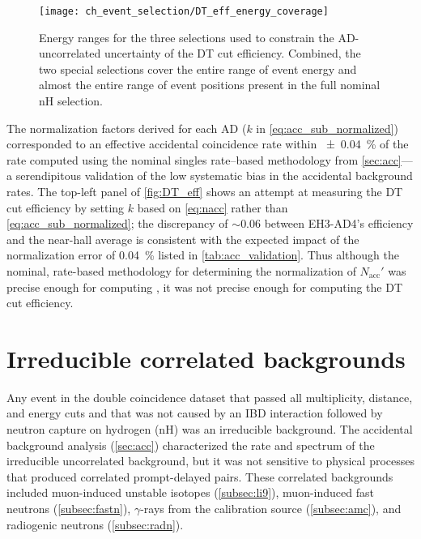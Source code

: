 \begin{figure}
    \centering
    \texttt{[image: ch\_event\_selection/DT\_eff\_energy\_coverage]}
    \caption[DT efficiency study energy coverage]{
        Energy ranges for the three selections used to constrain
        the AD-uncorrelated uncertainty of the DT cut efficiency.
        Combined, the two special selections cover the entire range of event energy
        and almost the entire range of event positions
        present in the full nominal nH selection.
    }
    \label{fig:DT_energy_range}
\end{figure}

The normalization factors derived for each AD ($k$ in \cref{eq:acc_sub_normalized})
corresponded to an effective accidental coincidence rate
within \SI{\pm0.04}{\percent} of the rate computed
using the nominal singles rate--based methodology from \cref{sec:acc}---%
a serendipitous validation of the low systematic bias
in the accidental background rates.
The top-left panel of \cref{fig:DT_eff} shows an attempt
at measuring the DT cut efficiency by setting $k$ based on \cref{eq:nacc}
rather than \cref{eq:acc_sub_normalized};
the discrepancy of ${\sim}0.06$ between EH3-AD4's efficiency and the near-hall average
is consistent with the expected impact
of the normalization error of \SI{0.04}{\percent} listed in \cref{tab:acc_validation}.
Thus although the nominal, rate-based methodology
for determining the normalization of $N_\text{acc}'$
was precise enough
for computing \thetaot{},
it was not precise enough for computing the DT cut efficiency.

\section{Irreducible correlated backgrounds}
\label{sec:correlated_bg}

Any event in the double coincidence dataset
that passed all multiplicity, distance, and energy cuts
and that was not caused by an IBD interaction followed by
neutron capture on hydrogen (nH)
was an irreducible background.
The accidental background analysis (\cref{sec:acc})
characterized the rate and spectrum of
the irreducible uncorrelated background,
but it was not sensitive to physical processes that produced
correlated prompt-delayed pairs.
These correlated backgrounds included muon-induced unstable isotopes (\cref{subsec:li9}),
muon-induced fast neutrons (\cref{subsec:fastn}),
$\gamma$-rays from the \amc{} calibration source (\cref{subsec:amc}),
and radiogenic neutrons (\cref{subsec:radn}).

